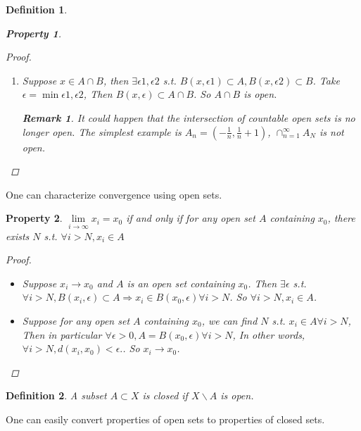 \documentclass{article}
\newtheorem*{property}{Property}
\newtheorem*{definition}{Definition}
\newtheorem*{remark}{Remark}
\begin{document}
\begin{definition}
\begin{property}
\begin{proof}
\begin{enumerate}
                So $\cup_\alpha A_\alpha$ is open.
                \item Suppose $x \in A \cap B$, 
                then $\exists \epsilon1, \epsilon2$ s.t. $B(x, \epsilon1) \subset A, B(x, \epsilon2) \subset B$.
                Take $\epsilon = \min{\epsilon1, \epsilon2}$, Then $B(x, \epsilon) \subset A \cap B$.
                So $A \cap B$ is open.
                \begin{remark}
                    It could happen that the intersection of countable open sets is no longer open.
                    The simplest example is $A_n = (-\frac{1}{n}, \frac{1}{n} + 1)$, $\cap_{n=1}^{\infty}{A_N}$ is not open.
                \end{remark}
            \end{enumerate}
        \end{proof}
    \end{property}
\end{definition}
One can characterize convergence using open sets.
\begin{property}
    $\lim\limits_{i \rightarrow \infty}{x_i}=x_0$ if and only if for any open set $A$ containing $x_0$, 
    there exists $N$ s.t. $\forall i > N, x_i \in A$
    \begin{proof} \hfill
        \begin{itemize}
            \item Suppose $x_i \rightarrow x_0$ and $A$ is an open set containing $x_0$.
            Then $\exists \epsilon$ s.t. $\forall i > N, B(x_i, \epsilon) \subset A  \Rightarrow x_i \in B(x_0, \epsilon) \forall i > N$.
            So $\forall i > N, x_i \in A$.
            \item Suppose for any open set $A$ containing $x_0$, we can find $N$ s.t. $x_i \in A \forall i > N$,
            Then in particular $\forall \epsilon > 0, A = B(x_0, \epsilon) \forall i > N$,
            In other words, $\forall i > N, d(x_i, x_0) < \epsilon.$.
            So $x_i \rightarrow x_0$.
        \end{itemize}
    \end{proof}
\end{property}
\begin{definition}
    A subset $A \subset X$ is closed if $X \backslash A$ is open.
\end{definition}
One can easily convert properties of open sets to properties of closed sets.
\end{document}
